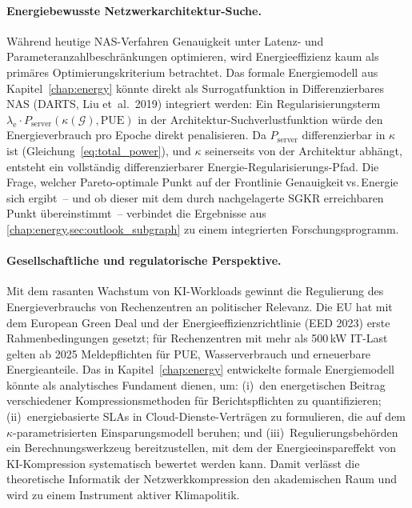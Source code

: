\documentclass[12pt, a4paper, openany]{report}
\newcommand{\calG}{\mathcal{G}}
\begin{document}
\paragraph{Energiebewusste Netzwerkarchitektur-Suche.}
Während heutige NAS-Verfahren Genauigkeit unter Latenz- und
Parameteranzahlbeschränkungen optimieren, wird Energieeffizienz kaum
als primäres Optimierungskriterium betrachtet.  Das formale Energiemodell
aus Kapitel~\ref{chap:energy} könnte direkt als Surrogatfunktion in
Differenzierbares NAS (DARTS, Liu et~al.\ 2019) integriert werden:
Ein Regularisierungsterm $\lambda_{\mathrm{e}} \cdot P_{\mathrm{server}}(\kappa(\calG), \mathrm{PUE})$
in der Architektur-Suchverlustfunktion würde den Energieverbrauch
pro Epoche direkt penalisieren.  Da $P_{\mathrm{server}}$ differenzierbar in
$\kappa$ ist (Gleichung~\eqref{eq:total_power}), und $\kappa$ seinerseits
von der Architektur abhängt, entsteht ein vollständig differenzierbarer
Energie-Regularisierungs-Pfad.  Die Frage, welcher Pareto-optimale Punkt
auf der Frontlinie Genauigkeit\,vs.\,Energie sich ergibt~-- und ob dieser
mit dem durch nachgelagerte SGKR erreichbaren Punkt übereinstimmt~--
verbindet die Ergebnisse aus \cref{chap:energy,sec:outlook_subgraph} zu
einem integrierten Forschungsprogramm.

\paragraph{Gesellschaftliche und regulatorische Perspektive.}
Mit dem rasanten Wachstum von KI-Workloads gewinnt die Regulierung des
Energieverbrauchs von Rechenzentren an politischer Relevanz.  Die EU hat
mit dem European Green Deal und der Energieeffizienzrichtlinie (EED 2023)
erste Rahmenbedingungen gesetzt; für Rechenzentren mit mehr als 500\,kW
IT-Last gelten ab 2025 Meldepflichten für PUE, Wasserverbrauch und
erneuerbare Energieanteile.  Das in Kapitel~\ref{chap:energy} entwickelte
formale Energiemodell könnte als analytisches Fundament dienen, um:
(i)~den energetischen Beitrag verschiedener Kompressionsmethoden für
Berichtspflichten zu quantifizieren; (ii)~energiebasierte SLAs in
Cloud-Dienste-Verträgen zu formulieren, die auf dem
$\kappa$-parametrisierten Einsparungsmodell beruhen; und
(iii)~Regulierungsbehörden ein Berechnungswerkzeug bereitzustellen, mit
dem der Energieeinspareffekt von KI-Kompression systematisch bewertet
werden kann.  Damit verlässt die theoretische Informatik der
Netzwerkkompression den akademischen Raum und wird zu einem Instrument
aktiver Klimapolitik.
\end{document}
